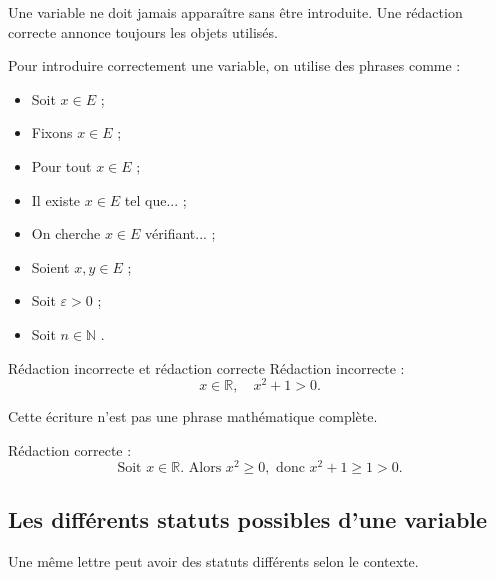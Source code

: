 \documentclass[11pt,a4paper]{article}
\begin{document}
Une variable ne doit jamais apparaître sans être introduite. Une rédaction correcte annonce toujours les objets utilisés.

\begin{methodebox}
Pour introduire correctement une variable, on utilise des phrases comme :
\begin{itemize}
    \item \og Soit $x\in E$ \fg{} ;
    \item \og Fixons $x\in E$ \fg{} ;
    \item \og Pour tout $x\in E$ \fg{} ;
    \item \og Il existe $x\in E$ tel que... \fg{} ;
    \item \og On cherche $x\in E$ vérifiant... \fg{} ;
    \item \og Soient $x,y\in E$ \fg{} ;
    \item \og Soit $\varepsilon>0$ \fg{} ;
    \item \og Soit $n\in\mathbb{N}$ \fg{}.
\end{itemize}
\end{methodebox}

\begin{exemplebox}{Rédaction incorrecte et rédaction correcte}{}
Rédaction incorrecte :
\[
x\in\mathbb{R},\quad x^2+1>0.
\]

Cette écriture n'est pas une phrase mathématique complète.

Rédaction correcte :
\[
\text{Soit } x\in\mathbb{R}. \text{ Alors } x^2\geq 0, \text{ donc } x^2+1\geq 1>0.
\]
\end{exemplebox}

\subsection{Les différents statuts possibles d'une variable}

Une même lettre peut avoir des statuts différents selon le contexte.
\end{document}
